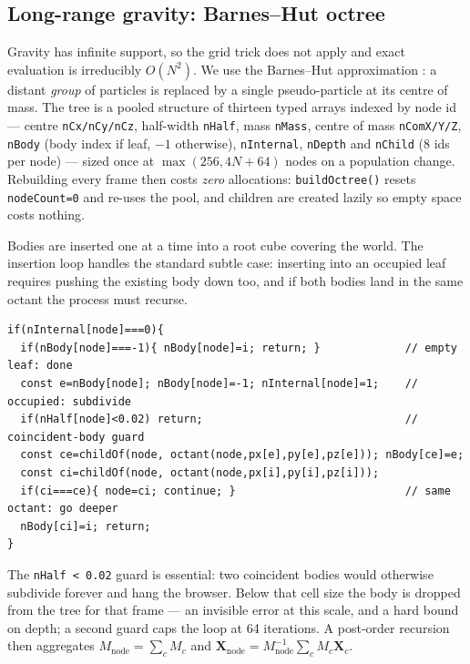 \documentclass[10pt,a4paper]{article}
\newcommand{\code}[1]{\texttt{\small #1}}
\begin{document}
\subsection{Long-range gravity: Barnes--Hut octree}
\label{sec:octree}

Gravity has infinite support, so the grid trick does not apply and exact evaluation is irreducibly
$O(N^2)$. We use the Barnes--Hut approximation \cite{barneshut}: a distant \emph{group} of particles is
replaced by a single pseudo-particle at its centre of mass. The tree is a pooled structure of thirteen
typed arrays indexed by node id --- centre \code{nCx/nCy/nCz}, half-width \code{nHalf}, mass \code{nMass},
centre of mass \code{nComX/Y/Z}, \code{nBody} (body index if leaf, $-1$ otherwise), \code{nInternal},
\code{nDepth} and \code{nChild} ($8$ ids per node) --- sized once at $\max(256, 4N+64)$ nodes on a
population change. Rebuilding every frame then costs \emph{zero} allocations: \code{buildOctree()} resets
\code{nodeCount=0} and re-uses the pool, and children are created lazily so empty space costs nothing.

Bodies are inserted one at a time into a root cube covering the world. The insertion loop handles the
standard subtle case: inserting into an occupied leaf requires pushing the existing body down too, and if
both bodies land in the same octant the process must recurse.

\begin{lstlisting}
if(nInternal[node]===0){
  if(nBody[node]===-1){ nBody[node]=i; return; }             // empty leaf: done
  const e=nBody[node]; nBody[node]=-1; nInternal[node]=1;    // occupied: subdivide
  if(nHalf[node]<0.02) return;                               // coincident-body guard
  const ce=childOf(node, octant(node,px[e],py[e],pz[e])); nBody[ce]=e;
  const ci=childOf(node, octant(node,px[i],py[i],pz[i]));
  if(ci===ce){ node=ci; continue; }                          // same octant: go deeper
  nBody[ci]=i; return;
}
\end{lstlisting}

\noindent The \code{nHalf < 0.02} guard is essential: two coincident bodies would otherwise subdivide
forever and hang the browser. Below that cell size the body is dropped from the tree for that frame --- an
invisible error at this scale, and a hard bound on depth; a second guard caps the loop at 64 iterations. A
post-order recursion then aggregates $M_{\text{node}}=\sum_c M_c$ and
$\mathbf{X}_{\text{node}}=M_{\text{node}}^{-1}\sum_c M_c\mathbf{X}_c$.
\end{document}
